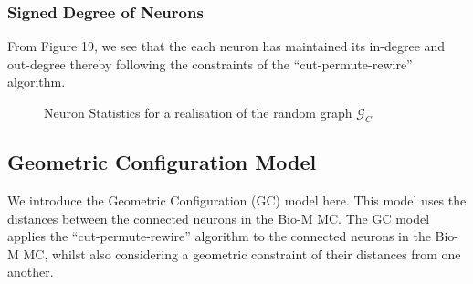 \subsubsection{Signed Degree of Neurons}
From Figure 19, we see that the each neuron has maintained its in-degree and out-degree thereby following the constraints of the ``cut-permute-rewire'' \cite{WattsStrogatz1998} algorithm.
\begin{figure}[H]%
    \centering
    \captionsetup{justification=centering}
    \qquad
    \caption{Neuron Statistics for a realisation of the random graph $\mathcal{G}_C$}%
    \label{fig:example}%
\end{figure}



\newpage
\subsection{Geometric Configuration Model}
We introduce the Geometric Configuration (GC) model here. This model uses the distances between the connected neurons in the Bio-M MC. The GC model applies the ``cut-permute-rewire'' \cite{WattsStrogatz1998} algorithm to the connected neurons in the Bio-M MC, whilst also considering a geometric constraint of their distances from one another.
